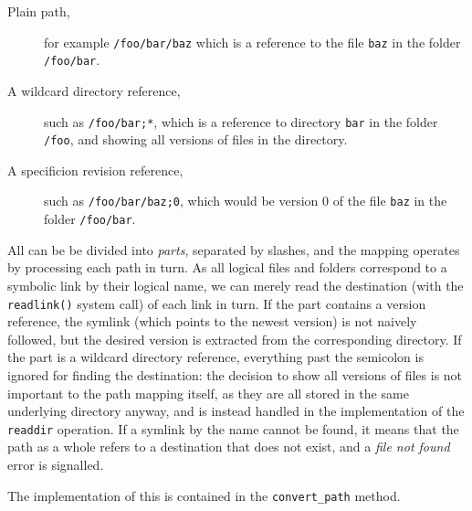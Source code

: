 \documentclass[12pt]{article}
\begin{document}
\begin{description}
\item[Plain path,] for example \texttt{/foo/bar/baz} which is a
  reference to the file \texttt{baz} in the folder \texttt{/foo/bar}.
\item[A wildcard directory reference,] such as \texttt{/foo/bar;*},
  which is a reference to directory \texttt{bar} in the folder
  \texttt{/foo}, and showing all versions of files in the directory.
\item[A specificion revision reference,] such as
  \texttt{/foo/bar/baz;0}, which would be version $0$ of the file
  \texttt{baz} in the folder \texttt{/foo/bar}.
\end{description}

All can be be divided into \textit{parts}, separated by slashes, and
the mapping operates by processing each path in turn.  As all logical
files and folders correspond to a symbolic link by their logical name,
we can merely read the destination (with the \texttt{readlink()}
system call) of each link in turn.  If the part contains a version
reference, the symlink (which points to the newest version) is not
naively followed, but the desired version is extracted from the
corresponding directory.  If the part is a wildcard directory
reference, everything past the semicolon is ignored for finding the
destination: the decision to show all versions of files is not
important to the path mapping itself, as they are all stored in the
same underlying directory anyway, and is instead handled in the
implementation of the \texttt{readdir} operation. If a symlink by the
name cannot be found, it means that the path as a whole refers to a
destination that does not exist, and a \textit{file not found} error
is signalled.

The implementation of this is contained in the \texttt{convert\_path}
method.
\end{document}
